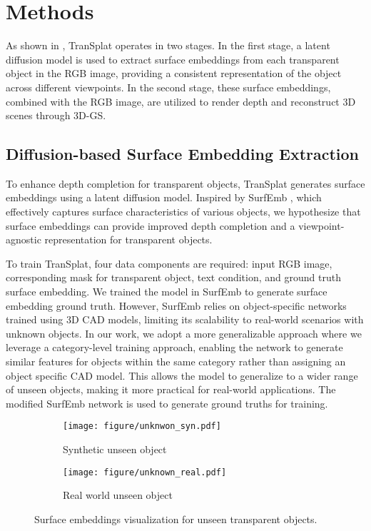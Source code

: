 \section{Methods}
As shown in , TranSplat operates in two stages. In the first stage, a latent diffusion model is used to extract surface embeddings from each transparent object in the RGB image, providing a consistent representation of the object across different viewpoints. In the second stage, these surface embeddings, combined with the RGB image, are utilized to render depth and reconstruct 3D scenes through \ac{3D-GS}. %

\subsection{Diffusion-based Surface Embedding Extraction}

To enhance depth completion for transparent objects, TranSplat generates surface embeddings using a latent diffusion model. Inspired by SurfEmb \cite{haugaard2022surfemb}, which effectively captures surface characteristics of various objects, we hypothesize that surface embeddings can provide improved depth completion and a viewpoint-agnostic representation for transparent objects.


To train TranSplat, four data components are required: input RGB image, corresponding mask for transparent object, text condition, and ground truth surface embedding. We trained the model in SurfEmb \cite{haugaard2022surfemb} to generate surface embedding ground truth. However, SurfEmb relies on object-specific networks trained using 3D CAD models, limiting its scalability to real-world scenarios with unknown objects. In our work, we adopt a more generalizable approach where we leverage a category-level training approach, enabling the network to generate similar features for objects within the same category rather than assigning an object specific CAD model. This allows the model to generalize to a wider range of unseen objects, making it more practical for real-world applications. The modified SurfEmb network is used to generate ground truths for training.

\begin{figure}[h]
  \centering
  \begin{subfigure}{0.49\columnwidth}
    \centering
    \texttt{[image: figure/unknwon\_syn.pdf]}
    \caption{Synthetic unseen object}
    \label{fig:unknown_syn}
  \end{subfigure}
  \begin{subfigure}{0.49\columnwidth}
    \centering
\texttt{[image: figure/unknown\_real.pdf]}
    \caption{Real world unseen object}
    \label{fig:unknown_real}
  \end{subfigure}
  \caption{Surface embeddings visualization for unseen transparent objects.}
  \label{fig:surfemb-example}
  \vspace{-6mm}
\end{figure}

